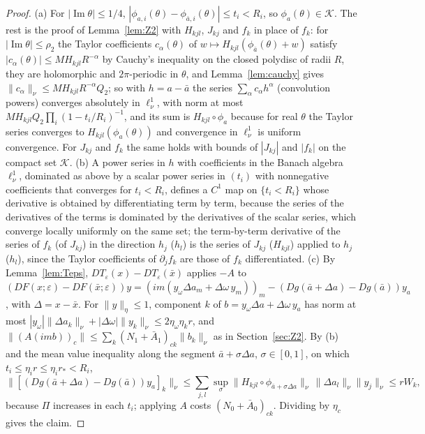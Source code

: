 \documentclass[11pt]{article}
\theoremstyle{definition}
\newcommand{\im}{\operatorname{Im}}
\begin{document}
\begin{proof}
(a) For $|\im\theta| \le 1/4$, $|\phi_{a,i}(\theta) - \phi_{\bar a,i}(\theta)| \le t_i < R_i$, so $\phi_a(\theta) \in \mathcal K$. The rest is the proof of Lemma~\ref{lem:Z2} with $H_{kjl}$, $J_{kj}$ and $f_k$ in place of $f_k$: for $|\im\theta| \le \rho_2$ the Taylor coefficients $c_\alpha(\theta)$ of $w \mapsto H_{kjl}(\phi_{\bar a}(\theta) + w)$ satisfy $|c_\alpha(\theta)| \le M\!H_{kjl}R^{-\alpha}$ by Cauchy's inequality on the closed polydisc of radii $R$, they are holomorphic and $2\pi$-periodic in $\theta$, and Lemma~\ref{lem:cauchy} gives $\|c_\alpha\|_\nu \le M\!H_{kjl}R^{-\alpha}Q_2$; so with $h = a - \bar a$ the series $\sum_\alpha c_\alpha h^\alpha$ (convolution powers) converges absolutely in $\ell^1_\nu$, with norm at most $M\!H_{kjl}Q_2\prod_i(1 - t_i/R_i)^{-1}$, and its sum is $H_{kjl}\circ\phi_a$ because for real $\theta$ the Taylor series converges to $H_{kjl}(\phi_a(\theta))$ and convergence in $\ell^1_\nu$ is uniform convergence. For $J_{kj}$ and $f_k$ the same holds with bounds of $|J_{kj}|$ and $|f_k|$ on the compact set $\mathcal K$. (b) A power series in $h$ with coefficients in the Banach algebra $\ell^1_\nu$, dominated as above by a scalar power series in $(t_i)$ with nonnegative coefficients that converges for $t_i < R_i$, defines a $C^1$ map on $\{t_i < R_i\}$ whose derivative is obtained by differentiating term by term, because the series of the derivatives of the terms is dominated by the derivatives of the scalar series, which converge locally uniformly on the same set; the term-by-term derivative of the series of $f_k$ (of $J_{kj}$) in the direction $h_j$ ($h_l$) is the series of $J_{kj}$ ($H_{kjl}$) applied to $h_j$ ($h_l$), since the Taylor coefficients of $\partial_jf_k$ are those of $f_k$ differentiated. (c) By Lemma~\ref{lem:Teps}, $DT_\varepsilon(x) - DT_\varepsilon(\bar x)$ applies $-A$ to $(DF(x;\varepsilon) - DF(\bar x;\varepsilon))y = (im(y_\omega\Delta a_m + \Delta\omega\,y_m))_m - (Dg(\bar a + \Delta a) - Dg(\bar a))y_a$, with $\Delta = x - \bar x$. For $\|y\|_\eta \le 1$, component $k$ of $b = y_\omega\Delta a + \Delta\omega\,y_a$ has norm at most $|y_\omega|\|\Delta a_k\|_\nu + |\Delta\omega|\|y_k\|_\nu \le 2\eta_\omega\eta_kr$, and $\|(A(imb))_c\| \le \sum_k(N_1 + \bar A_1)_{ck}\|b_k\|_\nu$ as in Section~\ref{sec:Z2}. By (b) and the mean value inequality along the segment $\bar a + \sigma\Delta a$, $\sigma \in [0, 1]$, on which $t_i \le \eta_ir \le \eta_ir_* < R_i$,
\[ \big\|[(Dg(\bar a + \Delta a) - Dg(\bar a))y_a]_k\big\|_\nu \le \sum_{j,l}\sup_\sigma\|H_{kjl}\circ\phi_{\bar a + \sigma\Delta a}\|_\nu\,\|\Delta a_l\|_\nu\|y_j\|_\nu \le rW_k, \]
because $\Pi$ increases in each $t_i$; applying $A$ costs $(N_0 + \bar A_0)_{ck}$. Dividing by $\eta_c$ gives the claim.
\end{proof}
\end{document}
